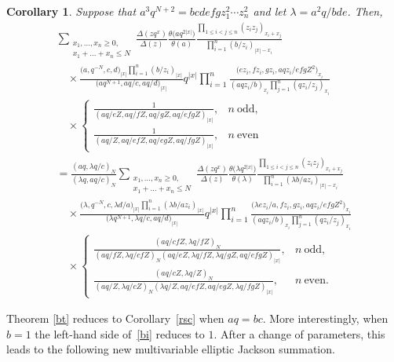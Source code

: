 \documentclass[pdftex]{sigma}
\numberwithin{equation}{section}
\newtheorem{Corollary}[Theorem]{Corollary}
\begin{document}
\begin{Corollary}\label{bc}
Suppose that $a^3q^{N+2}=bcdefgz_1^2\dotsm z_n^2$ and let $\lambda=a^2q/bde$. Then,
\begin{gather*}
\sum_{\substack{x_1,\dots,x_n\geq 0,\\x_1+\dots+x_n\leq N}}
\frac{\Delta(zq^x)}{\Delta(z)}\frac{\theta\big(a q^{2|x|}\big)}{\theta(a)}
\frac{\prod\limits_{1\leq i<j\leq n}(z_iz_j)_{x_i+x_j}}{\prod\limits_{i=1}^n(b/z_i)_{|x|-x_i}}\\
\quad\times\frac{\big(a,q^{-N},c,d\big)_{|x|}\prod\limits_{i=1}^n(b/z_i)_{|x|}}{\big(a q^{N+1},aq/c,aq/d\big)_{|x|}}q^{|x|}\prod\limits_{i=1}^n\frac{\big(ez_i,fz_i,gz_i,aqz_i/efgZ^2\big)_{x_i}}{(aqz_i/b)_{x_i}\prod\limits_{j=1}^n(qz_i/z_j)_{x_i}}\\
\quad\times\begin{cases}\displaystyle\frac{1}{(a q/eZ,a q/fZ,a q/gZ,aq/efgZ)_{|x|}}, & n~\text{odd},\\[4mm]
\displaystyle\frac{1}{(aq/Z,a q/efZ,a q/egZ,a q/fgZ)_{|x|}}, & n~\text{even}\end{cases}\\
=\frac{(aq,\lambda q/c)_N}{(\lambda q,aq/c)_N}\sum_{\substack{x_1,\dots,x_n\geq 0,\\x_1+\dots+x_n\leq N}}
\frac{\Delta(zq^x)}{\Delta(z)}\frac{\theta\big(\lambda q^{2|x|}\big)}{\theta(\lambda)}
\frac{\prod\limits_{1\leq i<j\leq n}(z_iz_j)_{x_i+x_j}}{\prod\limits_{i=1}^n(\lambda b/az_i)_{|x|-x_i}}\\
\quad\times\frac{\big(\lambda,q^{-N},c,\lambda d/a\big)_{|x|}\prod\limits_{i=1}^n(\lambda b/az_i)_{|x|}}{\big(\lambda q^{N+1}, \lambda q/c,aq/d\big)_{|x|}}q^{|x|}\prod\limits_{i=1}^n\frac{\big(\lambda ez_i/a,fz_i,gz_i,aqz_i/efgZ^2\big)_{x_i}}{(aqz_i/b)_{x_i}\prod\limits_{j=1}^n(qz_i/z_j)_{x_i}}\\
\quad\times\begin{cases}\displaystyle\frac{(aq/cfZ,\lambda q/fZ)_N}{(aq/fZ,\lambda q/cfZ)_N(aq/eZ,\lambda q/fZ,\lambda q/gZ,aq/efgZ)_{|x|}}, & n~\text{odd},\\[4mm]
\displaystyle\frac{(a q/cZ,\lambda q/Z)_N}{(aq/Z,\lambda q/cZ)_N(\lambda q/Z,a q/efZ,a q/egZ,\lambda q/fgZ)_{|x|}}, & n~\text{even}.
\end{cases}
\end{gather*}
\end{Corollary}

Theorem \ref{bt} reduces to Corollary~\ref{rsc} when $aq=bc$. More interestingly, when $b=1$ the left-hand side of~\eqref{bi} reduces to $1$. After a change of parameters, this leads to the following new multivariable elliptic Jackson summation.
\end{document}
